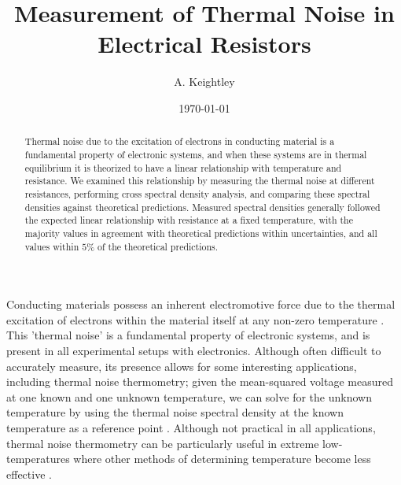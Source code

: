 \documentclass[aps,prl,twocolumn,superscriptaddress]{revtex4-1}
\begin{document}
\title{Measurement of Thermal Noise in Electrical Resistors}


\author{A. Keightley}
\date{\today}


\newcommand{\rxx}{{R}_{xx}}
\newcommand{\rxy}{{R}_{xy}}
\newcommand{\rdp}{{R}_{D}^+}
\newcommand{\rdm}{{R}_{D}^-}
\newcommand{\freqS}{492\text{Hz}}
\newcommand{\freqF}{15492\text{Hz}}
\newcommand{\binsize}{12\text{Hz}}

\begin{abstract}
Thermal noise due to the excitation of electrons in conducting material is a fundamental property of electronic systems, and when these systems are in thermal equilibrium it is theorized to have a linear relationship with temperature and resistance. We examined this relationship by measuring the thermal noise at different resistances, performing cross spectral density analysis, and comparing these spectral densities against theoretical predictions. Measured spectral densities generally followed the expected linear relationship with resistance at a fixed temperature, with the majority values in agreement with theoretical predictions within uncertainties, and all values within $5\%$ of the theoretical predictions.
\end{abstract}

\pacs{}

\maketitle


Conducting materials possess an inherent electromotive force due to the thermal excitation of electrons within the material itself at any non-zero temperature \cite{Nyquist1928}. This 'thermal noise' is a fundamental property of electronic systems, and is present in all experimental setups with electronics. Although often difficult to accurately measure, its presence allows for some interesting applications, including thermal noise thermometry; given the mean-squared voltage measured at one known and one unknown temperature, we can solve for the unknown temperature by using the thermal noise spectral density at the known temperature as a reference point \cite{JNThermometry2003}. Although not practical in all applications, thermal noise thermometry can be particularly useful in extreme low-temperatures where other methods of determining temperature become less effective \cite{Qu2019}.
\end{document}
